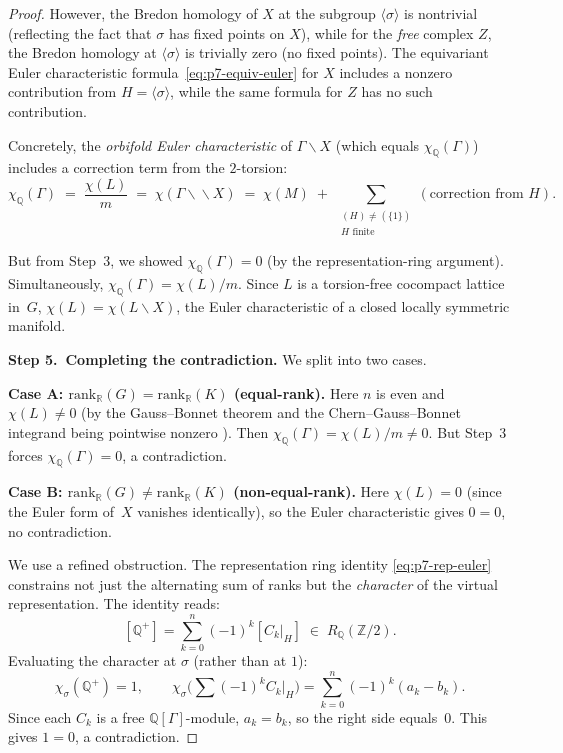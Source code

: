 \begin{proof}
However, the Bredon homology of $X$ at the subgroup $\langle\sigma\rangle$
is nontrivial (reflecting the fact that $\sigma$ has fixed points on $X$),
while for the \emph{free} complex $Z$, the Bredon homology at
$\langle\sigma\rangle$ is trivially zero (no fixed points). The equivariant
Euler characteristic formula~\eqref{eq:p7-equiv-euler} for $X$ includes a
nonzero contribution from $H = \langle\sigma\rangle$, while the same
formula for $Z$ has no such contribution.

Concretely, the \emph{orbifold Euler characteristic} of
$\Gamma\backslash X$ (which equals $\chi_\mathbb{Q}(\Gamma)$) includes
a correction term from the $2$-torsion:
\begin{equation}
\label{eq:p7-orbifold-chi}
\chi_\mathbb{Q}(\Gamma)
\;=\;
\frac{\chi(L)}{m}
\;=\;
\chi(\Gamma\backslash\!\backslash X)
\;=\;
\chi(M) \;+\;
\sum_{\substack{(H)\ne(\{1\}) \\ H\text{ finite}}}
  (\text{correction from } H).
\end{equation}

But from Step~3, we showed $\chi_\mathbb{Q}(\Gamma)= 0$ (by the representation-ring
argument). Simultaneously, $\chi_\mathbb{Q}(\Gamma) = \chi(L)/m$. Since $L$ is
a torsion-free cocompact lattice in~$G$, $\chi(L) = \chi(L\backslash X)$,
the Euler characteristic of a closed locally symmetric manifold.

\textbf{Step 5.\ Completing the contradiction.}
We split into two cases.

\textbf{Case A: $\mathrm{rank}_\mathbb{R}(G) = \mathrm{rank}_\mathbb{R}(K)$
(equal-rank).}
Here $n$ is even and $\chi(L)\ne 0$ (by the Gauss--Bonnet theorem and the
Chern--Gauss--Bonnet integrand being pointwise nonzero \cite{Bor85, Harder71}).
Then $\chi_\mathbb{Q}(\Gamma) = \chi(L)/m \ne 0$. But Step~3 forces
$\chi_\mathbb{Q}(\Gamma) = 0$, a contradiction.

\textbf{Case B: $\mathrm{rank}_\mathbb{R}(G) \ne \mathrm{rank}_\mathbb{R}(K)$
(non-equal-rank).}
Here $\chi(L) = 0$ (since the Euler form of~$X$ vanishes identically),
so the Euler characteristic gives $0 = 0$, no contradiction.

We use a refined obstruction. The representation ring identity
\eqref{eq:p7-rep-euler} constrains not just the alternating sum of ranks but
the \emph{character} of the virtual representation. The identity reads:
\[
  [\mathbb{Q}^+]
  = \sum_{k=0}^n (-1)^k [C_k|_H]
  \;\in\; R_\mathbb{Q}(\mathbb{Z}/2).
\]
Evaluating the character at $\sigma$ (rather than at $1$):
\[
  \chi_\sigma(\mathbb{Q}^+) = 1,
  \qquad
  \chi_\sigma\bigl(\sum (-1)^k C_k|_H\bigr) = \sum_{k=0}^n (-1)^k (a_k - b_k).
\]
Since each $C_k$ is a free $\mathbb{Q}[\Gamma]$-module, $a_k = b_k$, so the
right side equals~$0$. This gives $1 = 0$, a contradiction.


\end{proof}
